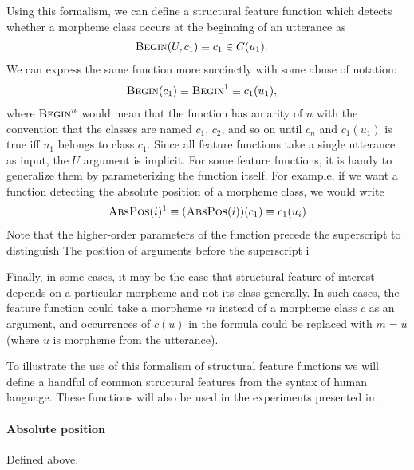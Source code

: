Using this formalism, we can define a structural feature function which detects whether a morpheme class occurs at the beginning of an utterance as
\begin{align}
  \textsc{Begin}(U, c_1) &\equiv c_1 \in C(u_1)
  .
\end{align}
We can express the same function more succinctly with some abuse of notation:
\begin{align}
  \textsc{Begin}(c_1) \equiv \textsc{Begin}^1 &\equiv c_1(u_1)
  ,
\end{align}
where $\textsc{Begin}^n$ would mean that the function has an arity of $n$ with the convention that the classes are named $c_1$, $c_2$, and so on until $c_n$
  and $c_1(u_1)$ is true iff $u_1$ belongs to class $c_1$.
Since all feature functions take a single utterance as input, the $U$ argument is implicit.
For some feature functions, it is handy to generalize them by parameterizing the function itself.
For example, if we want a function detecting the absolute position of a morpheme class, we would write
\begin{align}
  \textsc{AbsPos}(i)^1 \equiv (\textsc{AbsPos}(i))(c_1) \equiv c_1(u_i)
\end{align}
Note that the higher-order parameters of the function precede the superscript to distinguish The position of arguments before the superscript i

Finally, in some cases, it may be the case that structural feature of interest depends on a particular morpheme and not its class generally.
In such cases, the feature function could take a morpheme $m$ instead of a morpheme class $c$ as an argument, and occurrences of $c(u)$ in the formula could be replaced with $m = u$ (where $u$ is morpheme from the utterance).

To illustrate the use of this formalism of structural feature functions we will define a handful of common structural features from the syntax of human language.
These functions will also be used in the experiments presented in .

\paragraph{Absolute position}
Defined above.

